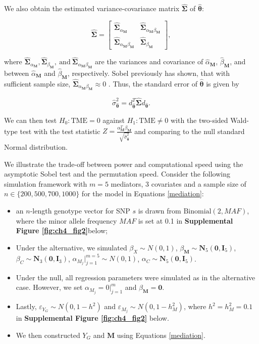\documentclass[11pt]{article}
\begin{document}
We also obtain the estimated 
variance-covariance matrix $\hat{\boldsymbol{\Sigma}}$ 
of $\hat{\boldsymbol{\theta}}$:

$$ \hat{\boldsymbol{\Sigma}} = 
\begin{bmatrix}
\hat{\boldsymbol{\Sigma}}_{\alpha_\mathbf{M}} & \hat{\boldsymbol{\Sigma}}_{\alpha_\mathbf{M}\beta_\mathbf{M}} \\
\hat{\boldsymbol{\Sigma}}_{\alpha_\mathbf{M}\beta_\mathbf{M}} & \hat{\boldsymbol{\Sigma}}_{\beta_\mathbf{M}}
\end{bmatrix},$$

where $\hat{\boldsymbol{\Sigma}}_{\alpha_\mathbf{M}}, \hat{\boldsymbol{\Sigma}}_{\beta_\mathbf{M}},~\text{and}~ \hat{\boldsymbol{\Sigma}}_{\alpha_\mathbf{M}\beta_\mathbf{M}}$
are the variances and covariance of $\hat{\alpha}_{\mathbf{M}}$,
$\hat{\beta}_{\mathbf{M}}$, and between 
$\hat{\alpha}_{\mathbf{M}}$ and
$\hat{\beta}_{\mathbf{M}}$, respectively. Sobel previously
has shown, that with sufficient sample size,
$\hat{\boldsymbol{\Sigma}}_{\alpha_\mathbf{M}\beta_\mathbf{M}}
\approx 0$ \cite{Sobel1982AsymptoticModels,Sobel1987DirectModels}.
Thus, the standard error of $\hat{\boldsymbol{\theta}}$
is given by 

$$\hat{\sigma}^2_{\hat{\boldsymbol{\theta}}} = d_{\hat{\boldsymbol{\theta}}}^T\hat{\boldsymbol{\Sigma}}d_{\hat{\boldsymbol{\theta}}}.$$

We can then test $H_0:\text{TME} = 0$ against $H_1:\text{TME} \neq 0$
with the two-sided Wald-type test with the test statistic 
$Z =
\frac{\alpha_{\mathbf{M}}^T\beta_{\mathbf{M}}}{\sqrt{\hat{\sigma}^2_{\hat{\boldsymbol{\theta}}}}}$ and comparing to the null standard Normal distribution.

We illustrate the trade-off between power and computational speed
using the asymptotic Sobel test and the permutation speed.
Consider the following simulation framework with $m=5$ mediators,
3 covariates
and a sample size of $n \in \{200, 500, 700, 1000\}$
for the model in Equations \ref{mediation}:

\begin{itemize}
\item an $n$-length genotype vector for SNP
$s$ is drawn from $\text{Binomial}(2,MAF)$, where
the minor allele frequency $MAF$ is set at 0.1 in \textbf{Supplemental Figure \ref{fig:ch4_fig2}}below;
\item Under the alternative, we simulated 
$\beta_X \sim N(0,1)$,
$\beta_\mathbf{M} \sim \mathbf{N}_5(\mathbf{0},\mathbf{I}_5)$,
$\beta_C \sim \mathbf{N}_3(\mathbf{0},\mathbf{I}_3)$,
$\alpha_{M_j}|_{j=1}^{m=5} \sim N(0,1)$,
$\alpha_C \sim \mathbf{N}_5(\mathbf{0},\mathbf{I}_5)$.
\item Under the null, all regression parameters
were simulated as in the alternative case. However,
we set $\alpha_{M_j} = 0|_{j=1}^m$ and $\beta_{\mathbf{M}} = \mathbf{0}$.
\item Lastly, $\varepsilon_{Y_G} \sim N(0,1-h^2)$
and $\varepsilon_{M_j} \sim N(0,1-h^2_M)$, where
$h^2 = h^2_M = 0.1$ in \textbf{Supplemental Figure \ref{fig:ch4_fig2}} below.
\item We then constructed $Y_G$ and $\mathbf{M}$
using Equations \ref{mediation}.
\end{itemize}
\end{document}
